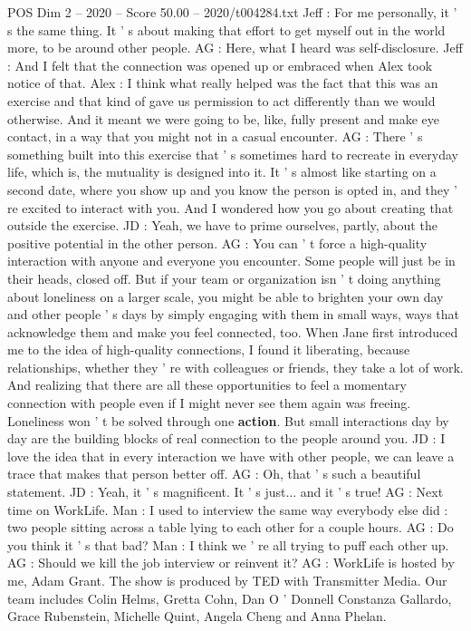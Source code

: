 \begin{textsample}{POS Dim 2 – 2020 – Score 50.00 – 2020/t004284.txt}
Jeff : For me personally, it ' s the same thing.
It ' s about making that effort to get myself out in the world more, to be around other people.
AG : Here, what I heard was self-disclosure.
Jeff : And I felt that the connection was opened up or embraced when Alex took notice of that.
Alex : I think what really helped was the fact that this was an exercise and that kind of gave us permission to act differently than we would otherwise.
And it meant we were going to be, like, fully present and make eye contact, in a way that you might not in a casual encounter.
AG : There ' s something built into this exercise that ' s sometimes hard to recreate in everyday life, which is, the mutuality is designed into it.
It ' s almost like starting on a second date, where you show up and you know the person is opted in, and they ' re excited to interact with you.
And I wondered how you go about creating that outside the exercise.
JD : Yeah, we have to prime ourselves, partly, about the positive potential in the other person.
AG : You can ' t force a high-quality interaction with anyone and everyone you encounter.
Some people will just be in their heads, closed off.
But if your team or organization isn ' t doing anything about loneliness on a larger scale, you might be able to brighten your own day and other people ' s days by simply engaging with them in small ways, ways that acknowledge them and make you feel connected, too.
When Jane first introduced me to the idea of high-quality connections, I found it liberating, because relationships, whether they ' re with colleagues or friends, they take a lot of work.
And realizing that there are all these opportunities to feel a momentary connection with people even if I might never see them again was freeing.
Loneliness won ' t be solved through one \textbf{action}.
But small interactions day by day are the building blocks of real connection to the people around you.
JD : I love the idea that in every interaction we have with other people, we can leave a trace that makes that person better off.
AG : Oh, that ' s such a beautiful statement.
JD : Yeah, it ' s magnificent.
It ' s just... and it ' s true!
AG : Next time on WorkLife.
Man : I used to interview the same way everybody else did : two people sitting across a table lying to each other for a couple hours.
AG : Do you think it ' s that bad?
Man : I think we ' re all trying to puff each other up.
AG : Should we kill the job interview or reinvent it?
AG : WorkLife is hosted by me, Adam Grant.
The show is produced by TED with Transmitter Media.
Our team includes Colin Helms, Gretta Cohn, Dan O ' Donnell Constanza Gallardo, Grace Rubenstein, Michelle Quint, Angela Cheng and Anna Phelan.

\end{textsample}
